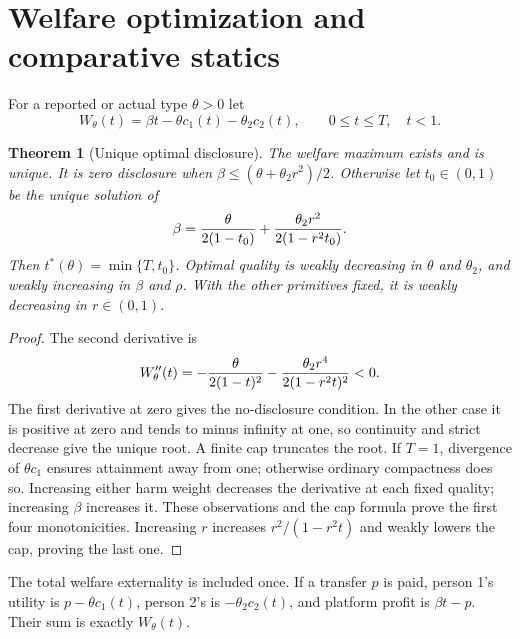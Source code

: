 \documentclass[11pt,a4paper]{article}
\newtheorem{theorem}{Theorem}[section]
\theoremstyle{definition}
\theoremstyle{remark}
\begin{document}
\section{Welfare optimization and comparative statics}
For a reported or actual type $\theta>0$ let
\[
 W_\theta(t)=\beta t-\theta c_1(t)-\theta_2c_2(t),
 \qquad 0\le t\le T,\quad t<1.
\]
\begin{theorem}[Unique optimal disclosure]
The welfare maximum exists and is unique. It is zero disclosure when
$\beta\le(\theta+\theta_2r^2)/2$.
Otherwise let $t_0\in(0,1)$ be the unique solution of
\[
 \beta={\theta\over2(1-t_0)}+
                {\theta_2r^2\over2(1-r^2t_0)}.
\]
Then $t^*(\theta)=\min\{T,t_0\}$. Optimal quality is weakly decreasing in $\theta$ and $\theta_2$, and weakly increasing in $\beta$ and $\rho$. With the other primitives fixed, it is weakly decreasing in $r\in(0,1)$.
\end{theorem}
\begin{proof}
The second derivative is
\[
 W_\theta''(t)=-{\theta\over2(1-t)^2}
              -{\theta_2r^4\over2(1-r^2t)^2}<0.
\]
The first derivative at zero gives the no-disclosure condition. In the other case it is positive at zero and tends to minus infinity at one, so continuity and strict decrease give the unique root. A finite cap truncates the root. If $T=1$, divergence of $\theta c_1$ ensures attainment away from one; otherwise ordinary compactness does so. Increasing either harm weight decreases the derivative at each fixed quality; increasing $\beta$ increases it. These observations and the cap formula prove the first four monotonicities. Increasing $r$ increases $r^2/(1-r^2t)$ and weakly lowers the cap, proving the last one.
\end{proof}
The total welfare externality is included once. If a transfer $p$ is paid, person 1's utility is $p-\theta c_1(t)$, person 2's is $-\theta_2c_2(t)$, and platform profit is $\beta t-p$. Their sum is exactly $W_\theta(t)$.
\end{document}
